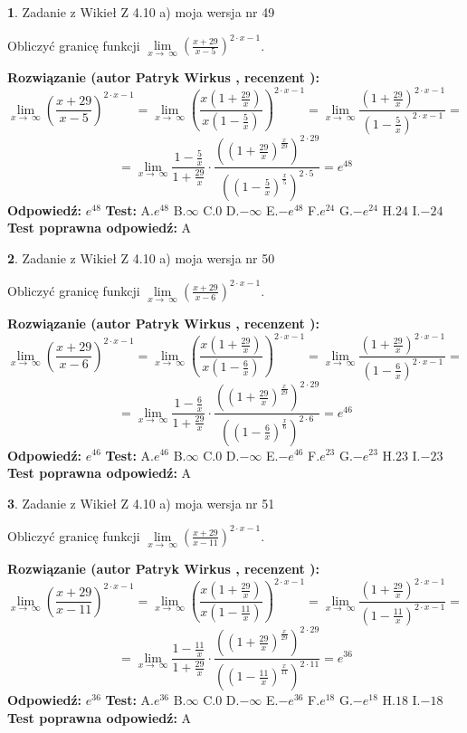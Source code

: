 \documentclass[12pt, a4paper]{article}
\theoremstyle{definition} %
\newtheorem{zad}{}
\newcommand{\zadStart}[1]{\begin{zad}#1\newline}
\newcommand{\zadStop}{\end{zad}}
\newcommand{\rozwStart}[2]{\noindent \textbf{Rozwiązanie (autor #1 , recenzent #2): }\newline}
\newcommand{\rozwStop}{\newline}
\newcommand{\odpStart}{\noindent \textbf{Odpowiedź:}\newline}
\newcommand{\odpStop}{\newline}
\newcommand{\testStart}{\noindent \textbf{Test:}\newline}
\newcommand{\testStop}{\newline}
\newcommand{\kluczStart}{\noindent \textbf{Test poprawna odpowiedź:}\newline}
\newcommand{\kluczStop}{\newline}
\begin{document}
\zadStart{Zadanie z Wikieł Z 4.10 a) moja wersja nr 49}

Obliczyć granicę funkcji  $\lim\limits_{x\to\ \infty}(\frac{x+29}{x-5})^{2\cdot x-1}$.
\zadStop
\rozwStart{Patryk Wirkus}{}
$$\lim\limits_{x\to\ \infty}(\frac{x+29}{x-5})^{2\cdot x-1} = \lim\limits_{x\to\ \infty}(\frac{x(1+\frac{29}{x})}{x(1-\frac{5}{x})})^{2\cdot x-1}=\lim\limits_{x\to\ \infty}\frac{(1+\frac{29}{x})^{2\cdot x-1}}{(1-\frac{5}{x})^{2\cdot x-1}}=$$
$$=\lim\limits_{x\to\ \infty}\frac{1-\frac{5}{x}}{1+\frac{29}{x}}\cdot\frac{((1+\frac{29}{x})^{\frac{x}{29}})^{2\cdot29}}{((1-\frac{5}{x})^{\frac{x}{5}})^{2\cdot5}}=e^{48}$$
\rozwStop
\odpStart
$e^{48}$
\odpStop
\testStart
A.$e^{48}$ B.$\infty$ C.$0$ D.$-\infty$ E.$-e^{48}$
F.$e^{24}$ G.$-e^{24}$
H.$24$
I.$-24$
\testStop
\kluczStart
A
\kluczStop



\zadStart{Zadanie z Wikieł Z 4.10 a) moja wersja nr 50}

Obliczyć granicę funkcji  $\lim\limits_{x\to\ \infty}(\frac{x+29}{x-6})^{2\cdot x-1}$.
\zadStop
\rozwStart{Patryk Wirkus}{}
$$\lim\limits_{x\to\ \infty}(\frac{x+29}{x-6})^{2\cdot x-1} = \lim\limits_{x\to\ \infty}(\frac{x(1+\frac{29}{x})}{x(1-\frac{6}{x})})^{2\cdot x-1}=\lim\limits_{x\to\ \infty}\frac{(1+\frac{29}{x})^{2\cdot x-1}}{(1-\frac{6}{x})^{2\cdot x-1}}=$$
$$=\lim\limits_{x\to\ \infty}\frac{1-\frac{6}{x}}{1+\frac{29}{x}}\cdot\frac{((1+\frac{29}{x})^{\frac{x}{29}})^{2\cdot29}}{((1-\frac{6}{x})^{\frac{x}{6}})^{2\cdot6}}=e^{46}$$
\rozwStop
\odpStart
$e^{46}$
\odpStop
\testStart
A.$e^{46}$ B.$\infty$ C.$0$ D.$-\infty$ E.$-e^{46}$
F.$e^{23}$ G.$-e^{23}$
H.$23$
I.$-23$
\testStop
\kluczStart
A
\kluczStop



\zadStart{Zadanie z Wikieł Z 4.10 a) moja wersja nr 51}

Obliczyć granicę funkcji  $\lim\limits_{x\to\ \infty}(\frac{x+29}{x-11})^{2\cdot x-1}$.
\zadStop
\rozwStart{Patryk Wirkus}{}
$$\lim\limits_{x\to\ \infty}(\frac{x+29}{x-11})^{2\cdot x-1} = \lim\limits_{x\to\ \infty}(\frac{x(1+\frac{29}{x})}{x(1-\frac{11}{x})})^{2\cdot x-1}=\lim\limits_{x\to\ \infty}\frac{(1+\frac{29}{x})^{2\cdot x-1}}{(1-\frac{11}{x})^{2\cdot x-1}}=$$
$$=\lim\limits_{x\to\ \infty}\frac{1-\frac{11}{x}}{1+\frac{29}{x}}\cdot\frac{((1+\frac{29}{x})^{\frac{x}{29}})^{2\cdot29}}{((1-\frac{11}{x})^{\frac{x}{11}})^{2\cdot11}}=e^{36}$$
\rozwStop
\odpStart
$e^{36}$
\odpStop
\testStart
A.$e^{36}$ B.$\infty$ C.$0$ D.$-\infty$ E.$-e^{36}$
F.$e^{18}$ G.$-e^{18}$
H.$18$
I.$-18$
\testStop
\kluczStart
A
\kluczStop
\end{document}
